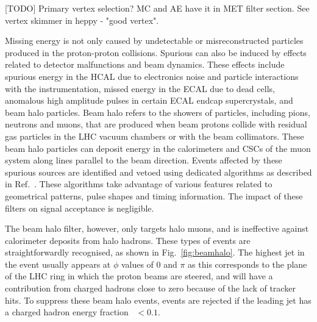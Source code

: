 [TODO] Primary vertex selection? MC and AE have it in MET filter section. See 
vertex skimmer in heppy - "good vertex".

Missing energy is not only caused by undetectable or misreconstructed particles 
produced in the proton-proton collisions. Spurious \met can also be induced by 
effects related to detector malfunctions and beam dynamics. These effects 
include spurious energy in the HCAL due to electronics noise and particle 
interactions with the instrumentation, missed energy in the ECAL due to dead 
cells, anomalous high amplitude pulses in certain ECAL endcap supercrystals, 
and beam halo particles. Beam halo refers to the showers of particles, 
including pions, neutrons and muons, that are produced when beam protons 
collide with residual gas particles in the LHC vacuum chambers or with the beam 
collimators. These beam halo particles can deposit energy in the calorimeters 
and CSCs of the muon system along lines parallel to the beam direction.
Events affected by these spurious \met sources are identified and vetoed using 
dedicated algorithms as described in Ref.~\cite{met-filters-16}. These 
algorithms take advantage of various features related to geometrical patterns, 
pulse shapes and timing information. The impact of these filters on signal 
acceptance is negligible.


The beam halo filter, however, only targets halo muons, and is ineffective 
against calorimeter deposits from halo hadrons. These types of events are 
straightforwardly recognised, as shown in Fig.~\ref{fig:beamhalo}. The highest 
\pt jet in the event usually appears at $\phi$ values of 0 and $\pi$ as this 
corresponds to the plane of the LHC ring in which the proton beams are steered, 
and will have a contribution from charged hadrons close to zero because of the 
lack of tracker hits. To suppress these beam halo events, events are rejected 
if the leading jet has a charged hadron energy fraction \chf~$<0.1$.

